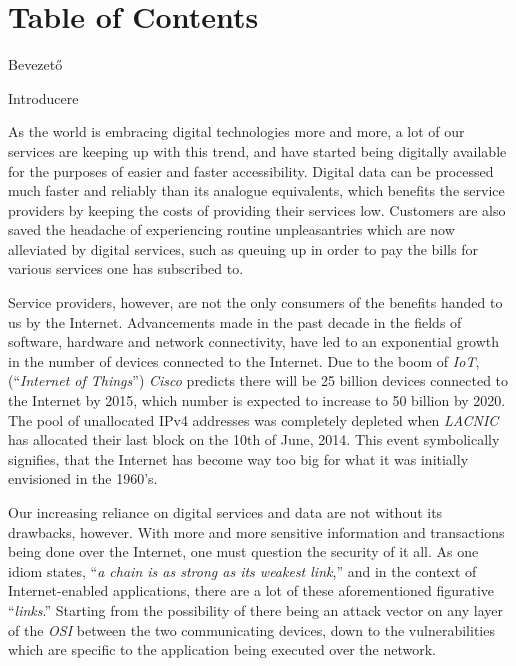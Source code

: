 \documentclass[a4paper,12pt]{article}
\newcommand\sectionhu[1]{\addcontentsline{toc.hu}{section} {\protect\numberline{\thesection} #1}}
\newcommand\sectionro[1]{\addcontentsline{toc.ro}{section} {\protect\numberline{\thesection} #1}}
\begin{document}
\section*{Table of Contents}

	\begingroup
	\renewcommand{\section}[2]{}
	\hypersetup{linkcolor=lightblue}
	\setlength{\parskip}{0em}
	\tableofcontents
	\endgroup

	\begingroup
	\hypersetup{linkcolor=lightblue}
	\listoffigures
	\listoftables
	\listoflistings
	\endgroup

\newpage
\pagestyle{fancy}
\section{Introduction}
\sectionhu{Bevezető} \sectionro{Introducere}

	As the world is embracing digital technologies more and more, a lot of our services are keeping up with this trend, and have started being digitally available for the purposes of easier and faster accessibility. Digital data can be processed much faster and reliably than its analogue equivalents, which benefits the service providers by keeping the costs of providing their services low. Customers are also saved the headache of experiencing routine unpleasantries which are now alleviated by digital services, such as queuing up in order to pay the bills for various services one has subscribed to.
	
	Service providers, however, are not the only consumers of the benefits handed to us by the Internet. Advancements made in the past decade in the fields of software, hardware and network connectivity, have led to an exponential growth in the number of devices connected to the Internet. Due to the boom of \textit{IoT}, (``\textit{Internet of Things}'') \textit{Cisco} predicts there will be 25 billion devices connected to the Internet by 2015, which number is expected to increase to 50 billion by 2020.\cite{devans11} The pool of unallocated IPv4 addresses was completely depleted when \textit{LACNIC} has allocated their last block on the 10th of June, 2014.\cite{ghouston11} This event symbolically signifies, that the Internet has become way too big for what it was initially envisioned in the 1960's.
	
	Our increasing reliance on digital services and data are not without its drawbacks, however. With more and more sensitive information and transactions being done over the Internet, one must question the security of it all. As one idiom states, ``\textit{a chain is as strong as its weakest link},'' and in the context of Internet-enabled applications, there are a lot of these aforementioned figurative ``\textit{links}.'' Starting from the possibility of there being an attack vector on any layer of the \textit{OSI} between the two communicating devices, down to the vulnerabilities which are specific to the application being executed over the network.
	
\end{document}
